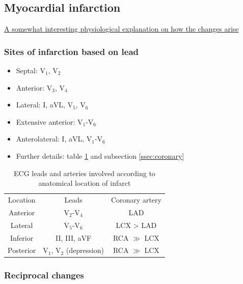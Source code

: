 \documentclass[
  12pt,
]{memoir}
\providecommand{\tightlist}{%
  \setlength{\itemsep}{0pt}\setlength{\parskip}{0pt}}
\begin{document}
\hypertarget{myocardial-infarction}{%
\subsection{Myocardial infarction}\label{myocardial-infarction}}

\href{https://www.cvphysiology.com/CAD/CAD012}{A somewhat interesting
physiological explanation on how the changes arise}

\hypertarget{sites-of-infarction-based-on-lead}{%
\subsubsection{Sites of infarction based on
lead}\label{sites-of-infarction-based-on-lead}}

\begin{itemize}
\tightlist
\item
  Septal: V\(_1\), V\(_2\)
\item
  Anterior: V\(_3\), V\(_4\)
\item
  Lateral: I, aVL, V\(_5\), V\(_6\)
\item
  Extensive anterior: V\(_1\)-V\(_6\)
\item
  Anterolateral: I, aVL, V\(_1\)-V\(_6\)
\item
  Further details: table \ref{table:infarct-loc} and subsection
  \ref{ssec:coronary}
\end{itemize}

\renewcommand{\arraystretch}{1.5}
\begin{table}[h!]
\centering
\begin{tabular}{|c|c|c|}
\hline
\cellcolor{violet!60}\color{white}Location &
\cellcolor{violet!60}\color{white}Leads &
\cellcolor{violet!60}\color{white}Coronary artery \\
Anterior & V$_2$-V$_4$ & LAD \\
Lateral & V$_5$-V$_6$ & LCX > LAD \\
Inferior & II, III, aVF & RCA $\gg$ LCX \\
Posterior & V$_1$, V$_2$ (depression) & RCA $\gg$ LCX \\
\hline
\end{tabular}
\vspace{3mm}
\caption{ECG leads and arteries involved according to anatomical location of infarct}
\label{table:infarct-loc}
\end{table}

\hypertarget{reciprocal-changes}{%
\subsubsection{Reciprocal changes}\label{reciprocal-changes}}
\end{document}
